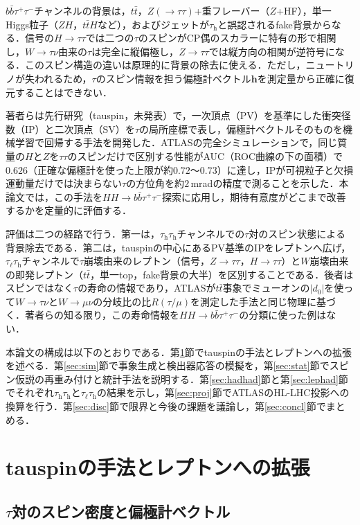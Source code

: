 \documentclass[paper=a4,fontsize=10pt,jafontsize=10pt,line_length=44zw,number_of_lines=46]{jlreq}
\newcommand{\tauh}{\tau_{\mathrm{h}}}
\newcommand{\taul}{\tau_{\ell}}
\newcommand{\bbtt}{b\bar b\tau^+\tau^-}
\newcommand{\hvec}{\boldsymbol{h}}
\begin{document}
$\bbtt$チャンネルの背景は，$t\bar t$，$Z(\to\tau\tau)$+重フレーバー（$Z$+HF），単一Higgs粒子（$ZH$，$t\bar tH$など），およびジェットが$\tauh$と誤認されるfake背景からなる\cite{ATLAS:2022xzm}．信号の$H\to\tau\tau$では二つの$\tau$のスピンがCP偶のスカラーに特有の形で相関し，$W\to\tau\nu$由来の$\tau$は完全に縦偏極し，$Z\to\tau\tau$では縦方向の相関が逆符号になる．このスピン構造の違いは原理的に背景の除去に使える．ただし，ニュートリノが失われるため，$\tau$のスピン情報を担う偏極計ベクトル$\hvec$を測定量から正確に復元することはできない．

著者らは先行研究（tauspin，未発表）で，一次頂点（PV）を基準にした衝突径数（IP）と二次頂点（SV）を$\tau$の局所座標で表し，偏極計ベクトルそのものを機械学習で回帰する手法を開発した．ATLASの完全シミュレーションで，同じ質量の$H$と$Z$を$\tau\tau$のスピンだけで区別する性能がAUC（ROC曲線の下の面積）で$0.626$（正確な偏極計を使った上限が約$0.72$〜$0.73$）に達し，IPが可視粒子と欠損運動量だけでは決まらない$\tau$の方位角を約$2$\,mradの精度で測ることを示した．本論文では，この手法を$HH\to\bbtt$探索に応用し，期待有意度がどこまで改善するかを定量的に評価する．

評価は二つの経路で行う．第一は，$\tauh\tauh$チャンネルでの$\tau$対のスピン状態による背景除去である．第二は，tauspinの中心にあるPV基準のIPをレプトンへ広げ，$\taul\tauh$チャンネルで$\tau$崩壊由来のレプトン（信号，$Z\to\tau\tau$，$H\to\tau\tau$）と$W$崩壊由来の即発レプトン（$t\bar t$，単一top，fake背景の大半）を区別することである．後者はスピンではなく$\tau$の寿命の情報であり，ATLASが$t\bar t$事象でミューオンの$|d_0|$を使って$W\to\tau\nu$と$W\to\mu\nu$の分岐比の比$R(\tau/\mu)$を測定した手法\cite{ATLAS:2020xea}と同じ物理に基づく．著者らの知る限り，この寿命情報を$HH\to\bbtt$の分類に使った例はない．

本論文の構成は以下のとおりである．第\ref{sec:tauspin}節でtauspinの手法とレプトンへの拡張を述べる．第\ref{sec:sim}節で事象生成と検出器応答の模擬を，第\ref{sec:stat}節でスピン仮説の再重み付けと統計手法を説明する．第\ref{sec:hadhad}節と第\ref{sec:lephad}節でそれぞれ$\tauh\tauh$と$\taul\tauh$の結果を示し，第\ref{sec:proj}節でATLASのHL-LHC投影への換算を行う．第\ref{sec:disc}節で限界と今後の課題を議論し，第\ref{sec:concl}節でまとめる．

\section{tauspinの手法とレプトンへの拡張}\label{sec:tauspin}

\subsection{$\tau$対のスピン密度と偏極計ベクトル}
\end{document}
